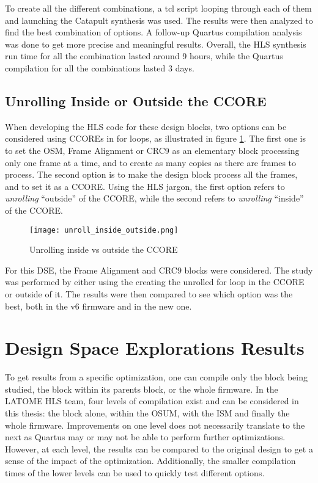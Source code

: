 To create all the different combinations, a tcl script looping through each of them and launching the Catapult synthesis was used. The results were then analyzed to find the best combination of options. A follow-up Quartus compilation analysis was done to get more precise and meaningful results. Overall, the HLS synthesis run time for all the combination lasted around 9 hours, while the Quartus compilation for all the combinations lasted 3 days.

\subsection{Unrolling Inside or Outside the CCORE}

When developing the HLS code for these design blocks, two options can be considered using CCOREs in for loops, as illustrated in figure \ref{fig:unrolling-inside-outside}. The first one is to set the OSM, Frame Alignment or CRC9 as an elementary block processing only one frame at a time, and to create as many copies as there are frames to process. The second option is to make the design block process all the frames, and to set it as a CCORE. Using the HLS jargon, the first option refers to \textit{unrolling} ``outside'' of the CCORE, while the second refers to \textit{unrolling} ``inside'' of the CCORE.

\begin{figure}
    \centering
    \texttt{[image: unroll\_inside\_outside.png]}
    \caption{Unrolling inside vs outside the CCORE}
    \label{fig:unrolling-inside-outside}
\end{figure}

For this DSE, the Frame Alignment and CRC9 blocks were considered. The study was performed by either using the creating the unrolled for loop in the CCORE or outside of it. The results were then compared to see which option was the best, both in the v6 firmware and in the new one.


\section{Design Space Explorations Results}

To get results from a specific optimization, one can compile only the block being studied, the block within its parents block, or the whole firmware. In the LATOME HLS team, four levels of compilation exist and can be considered in this thesis: the block alone, within the OSUM, with the ISM and finally the whole firmware. Improvements on one level does not necessarily translate to the next as Quartus may or may not be able to perform further optimizations. However, at each level, the results can be compared to the original design to get a sense of the impact of the optimization. Additionally, the smaller compilation times of the lower levels can be used to quickly test different options.

